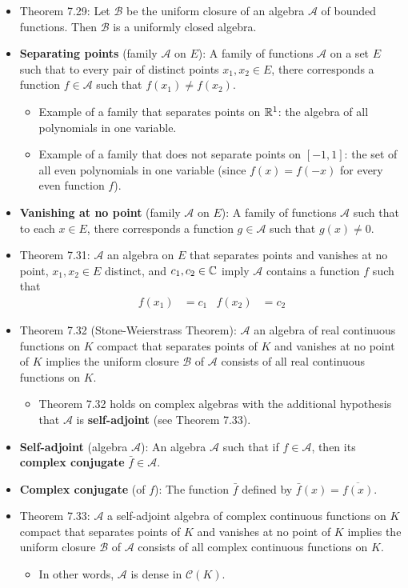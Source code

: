 \documentclass[../../notes.tex]{subfiles}
\begin{document}
\begin{itemize}
    \item Theorem 7.29: Let $\mathscr{B}$ be the uniform closure of an algebra $\mathscr{A}$ of bounded functions. Then $\mathscr{B}$ is a uniformly closed algebra.
    \item \textbf{Separating points} (family $\mathscr{A}$ on $E$): A family of functions $\mathscr{A}$ on a set $E$ such that to every pair of distinct points $x_1,x_2\in E$, there corresponds a function $f\in\mathscr{A}$ such that $f(x_1)\neq f(x_2)$.
    \begin{itemize}
        \item Example of a family that separates points on $\mathbb{R}^1$: the algebra of all polynomials in one variable.
        \item Example of a family that does not separate points on $[-1,1]$: the set of all even polynomials in one variable (since $f(x)=f(-x)$ for every even function $f$).
    \end{itemize}
    \item \textbf{Vanishing at no point} (family $\mathscr{A}$ on $E$): A family of functions $\mathscr{A}$ such that to each $x\in E$, there corresponds a function $g\in\mathscr{A}$ such that $g(x)\neq 0$.
    \item Theorem 7.31: $\mathscr{A}$ an algebra on $E$ that separates points and vanishes at no point, $x_1,x_2\in E$ distinct, and $c_1,c_2\in\mathbb{C}$ imply $\mathscr{A}$ contains a function $f$ such that
    \begin{align*}
        f(x_1) &= c_1&
        f(x_2) &= c_2
    \end{align*}
    \item Theorem 7.32 (Stone-Weierstrass Theorem): $\mathscr{A}$ an algebra of real continuous functions on $K$ compact that separates points of $K$ and vanishes at no point of $K$ implies the uniform closure $\mathscr{B}$ of $\mathscr{A}$ consists of all real continuous functions on $K$.
    \begin{itemize}
        \item Theorem 7.32 holds on complex algebras with the additional hypothesis that $\mathscr{A}$ is \textbf{self-adjoint} (see Theorem 7.33).
    \end{itemize}
    \item \textbf{Self-adjoint} (algebra $\mathscr{A}$): An algebra $\mathscr{A}$ such that if $f\in\mathscr{A}$, then its \textbf{complex conjugate} $\bar{f}\in\mathscr{A}$.
    \item \textbf{Complex conjugate} (of $f$): The function $\bar{f}$ defined by $\bar{f}(x)=\overline{f(x)}$.
    \item Theorem 7.33: $\mathscr{A}$ a self-adjoint algebra of complex continuous functions on $K$ compact that separates points of $K$ and vanishes at no point of $K$ implies the uniform closure $\mathscr{B}$ of $\mathscr{A}$ consists of all complex continuous functions on $K$.
    \begin{itemize}
        \item In other words, $\mathscr{A}$ is dense in $\mathscr{C}(K)$.
    \end{itemize}
\end{itemize}
\end{document}
